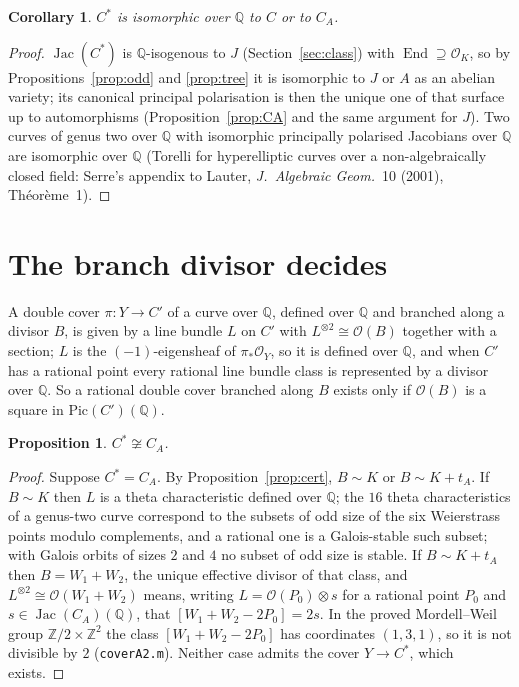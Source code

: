 \documentclass[11pt,reqno]{amsart}
\theoremstyle{plain}
\newtheorem{proposition}[theorem]{Proposition}
\newtheorem{corollary}[theorem]{Corollary}
\theoremstyle{definition}
\DeclareMathOperator{\Jac}{Jac}
\DeclareMathOperator{\End}{End}
\newcommand{\Q}{\mathbb{Q}}
\newcommand{\Z}{\mathbb{Z}}
\newcommand{\OK}{\mathcal{O}_K}
\begin{document}
\begin{corollary}\label{cor:torelli}
$C^*$ is isomorphic over $\Q$ to $C$ or to $C_A$.
\end{corollary}
\begin{proof}
$\Jac(C^*)$ is $\Q$-isogenous to $J$ (Section~\ref{sec:class}) with $\End\supseteq\OK$, so by
Propositions~\ref{prop:odd} and \ref{prop:tree} it is isomorphic to $J$ or $A$ as an abelian
variety; its canonical principal polarisation is then the unique one of that surface up to
automorphisms (Proposition~\ref{prop:CA} and the same argument for $J$). Two curves of genus two
over $\Q$ with isomorphic principally polarised Jacobians over $\Q$ are isomorphic over $\Q$
(Torelli for hyperelliptic curves over a non-algebraically closed field: Serre's appendix to
Lauter, \emph{J.\ Algebraic Geom.}\ 10 (2001), Th\'eor\`eme~1).
\end{proof}

\section{The branch divisor decides}\label{sec:decide}

A double cover $\pi:Y\to C'$ of a curve over $\Q$, defined over $\Q$ and branched along a divisor
$B$, is given by a line bundle $L$ on $C'$ with $L^{\otimes2}\cong\mathcal O(B)$ together with a
section; $L$ is the $(-1)$-eigensheaf of $\pi_*\mathcal O_Y$, so it is defined over $\Q$, and when
$C'$ has a rational point every rational line bundle class is represented by a divisor over $\Q$.
So a rational double cover branched along $B$ exists only if $\mathcal O(B)$ is a square in
$\mathrm{Pic}(C')(\Q)$.

\begin{proposition}\label{prop:notCA}
$C^*\not\cong C_A$.
\end{proposition}
\begin{proof}
Suppose $C^*=C_A$. By Proposition~\ref{prop:cert}, $B\sim K$ or $B\sim K+t_A$. If $B\sim K$ then
$L$ is a theta characteristic defined over $\Q$; the $16$ theta characteristics of a genus-two
curve correspond to the subsets of odd size of the six Weierstrass points modulo complements, and
a rational one is a Galois-stable such subset; with Galois orbits of sizes $2$ and $4$ no subset of
odd size is stable. If $B\sim K+t_A$ then $B=W_1+W_2$, the unique effective divisor of that class,
and $L^{\otimes2}\cong\mathcal O(W_1+W_2)$ means, writing $L=\mathcal O(P_0)\otimes s$ for a rational
point $P_0$ and $s\in\Jac(C_A)(\Q)$, that $[W_1+W_2-2P_0]=2s$. In the proved Mordell--Weil group
$\Z/2\times\Z^2$ the class $[W_1+W_2-2P_0]$ has coordinates $(1,3,1)$, so it is not divisible by $2$
(\texttt{coverA2.m}). Neither case admits the cover $Y\to C^*$, which exists.
\end{proof}
\end{document}
